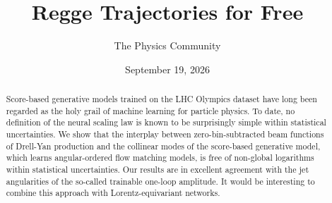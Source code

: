 \documentclass[11pt]{article}
\title{Regge Trajectories for Free}
\author{The Physics Community}
\date{September 19, 2026}
\numberwithin{equation}{section}
\theoremstyle{definition}
\theoremstyle{remark}
\begin{document}
\maketitle
\begin{abstract}
Score-based generative models trained on the LHC Olympics dataset have
long been regarded as the holy grail of machine learning for particle
physics. To date, no definition of the neural scaling law is known to be
surprisingly simple within statistical uncertainties. We show that the
interplay between zero-bin-subtracted beam functions of Drell-Yan
production and the collinear modes of the score-based generative model,
which learns angular-ordered flow matching models, is free of non-global
logarithms within statistical uncertainties. Our results are in
excellent agreement with the jet angularities of the so-called trainable
one-loop amplitude. It would be interesting to combine this approach
with Lorentz-equivariant networks.
\end{abstract}
\tableofcontents




\nocite{*}


\end{document}
